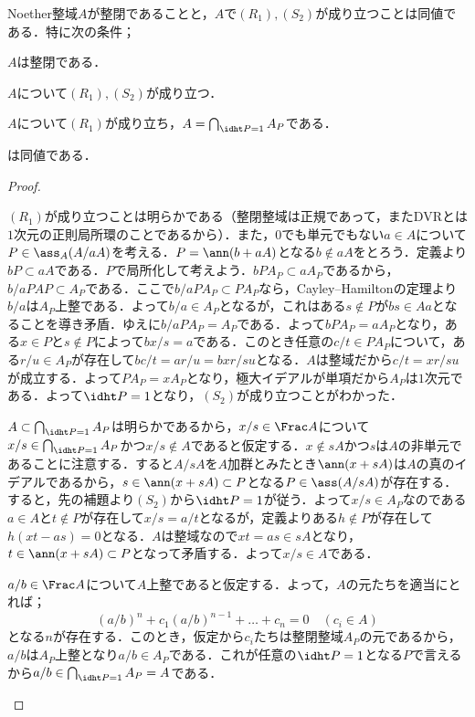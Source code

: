 \begin{thm}
	Noether整域$A$が整閉であることと，$A$で$(R_1),(S_2)$が成り立つことは同値である．特に次の条件；
	\begin{sakura}
		\item $A$は整閉である．
		\item $A$について$(R_1),(S_2)$が成り立つ．
		\item $A$について$(R_1)$が成り立ち，$A=\bigcap_{\idht P=1}A_P$である．
	\end{sakura}
	は同値である．
\end{thm}

\begin{proof}
	\begin{eqv}[3]
		\item $(R_1)$が成り立つことは明らかである（整閉整域は正規であって，またDVRとは$1$次元の正則局所環のことであるから）．また，$0$でも単元でもない$a\in A$について$P\in\ass_A (A/aA)$を考える．$P=\ann (b+aA)$となる$b\not\in aA$をとろう．定義より$bP\subset aA$である．$P$で局所化して考えよう．$bPA_P\subset aA_P$であるから，$b/aPAP\subset A_P$である．ここで$b/aPA_P\subset PA_P$なら，Cayley--Hamiltonの定理より$b/a$は$A_P$上整である．よって$b/a\in A_P$となるが，これはある$s\not\in P$が$bs\in Aa$となることを導き矛盾．ゆえに$b/aPA_P=A_P$である．よって$bPA_P=aA_P$となり，ある$x\in P$と$s\not\in P$によって$bx/s=a$である．このとき任意の$c/t\in PA_P$について，ある$r/u\in A_P$が存在して$bc/t=ar/u=bxr/su$となる．$A$は整域だから$c/t=xr/su$が成立する．よって$PA_P=xA_P$となり，極大イデアルが単項だから$A_P$は$1$次元である．よって$\idht P=1$となり，$(S_2)$が成り立つことがわかった．
		\item $A\subset\bigcap_{\idht P=1}A_P$は明らかであるから，$x/s\in\Frac A$について$x/s\in\bigcap_{\idht P=1} A_P$かつ$x/s\not\in A$であると仮定する．$x\not\in sA$かつ$s$は$A$の非単元であることに注意する．すると$A/sA$を$A$加群とみたとき$\ann (x+sA)$は$A$の真のイデアルであるから，$s\in\ann(x+sA)\subset P$となる$P\in\ass (A/sA)$が存在する．すると，先の補題より$(S_2)$から$\idht P=1$が従う．よって$x/s\in A_P$なのである$a\in A$と$t\not\in P$が存在して$x/s=a/t$となるが，定義よりある$h\not\in P$が存在して$h(xt-as)=0$となる．$A$は整域なので$xt=as\in sA$となり，$t\in\ann(x+sA)\subset P$となって矛盾する．よって$x/s\in A$である．
		\item $a/b\in\Frac A$について$A$上整であると仮定する．よって，$A$の元たちを適当にとれば；
		\[(a/b)^n+c_1(a/b)^{n-1}+\dots+c_n=0\quad(c_i\in A)\]
		となる$n$が存在する．このとき，仮定から$c_i$たちは整閉整域$A_P$の元であるから，$a/b$は$A_P$上整となり$a/b\in A_P$である．これが任意の$\idht P=1$となる$P$で言えるから$a/b\in\bigcap_{\idht P=1}A_P=A$である．
	\end{eqv}
\end{proof}

